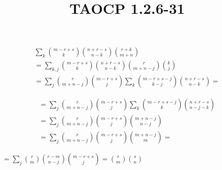 \documentclass{article}
\title{TAOCP 1.2.6\mbox{-}31}
\begin{document}
\maketitle

\begin{multline*}
\sum_{k} \binom{m-r+s}{k}\binom{n+r-s}{n-k}\binom{r+k}{m+n} \\
= \sum_{k,j} \binom{m-r+s}{k}\binom{n+r-s}{n-k}\binom{r}{m+n-j}\binom{k}{j} \\
= \sum_{j} \binom{r}{m+n-j}\binom{m-r+s}{j}\sum_{k} \binom{m-r+s-j}{k-j}\binom{n+r-s}{n-k} =
\end{multline*}

\begin{multline*}
= \sum_{j} \binom{r}{m+n-j}\binom{m-r+s}{j}\sum_{k} \binom{m-r+s-j}{k}\binom{n+r-s}{n-j-k} \\
= \sum_{j} \binom{r}{m+n-j}\binom{m-r+s}{j} \binom{m+n-j}{n-j} \\
= \sum_{j} \binom{r}{m+n-j}\binom{m-r+s}{j} \binom{m+n-j}{m} =
\end{multline*}

\( = \sum_{j} \binom{r}{m} \binom{r-m}{n-j}\binom{m-r+s}{j} = \binom{r}{m} \binom{s}{n} \)
\end{document}
